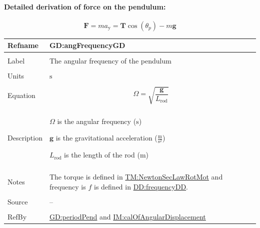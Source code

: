 \documentclass[12pt]{article}
\begin{document}
\paragraph{Detailed derivation of force on the pendulum:}
\label{GD:vForceOnPendulumDeriv}
\begin{displaymath}
\symbf{F}=m {a_{\text{y}}}=\symbf{T} \cos\left({θ_{p}}\right)-m \symbf{g}
\end{displaymath}
\vspace{\baselineskip}
\noindent
\begin{minipage}{\textwidth}
\begin{tabular}{>{\raggedright}p{}>{\raggedright\arraybackslash}p{}}
\toprule \textbf{Refname} & \textbf{GD:angFrequencyGD}
\label{GD:angFrequencyGD}
\\ \midrule \\
Label & The angular frequency of the pendulum
        
\\ \midrule \\
Units & ${\text{s}}$
        
\\ \midrule \\
Equation & \begin{displaymath}
           Ω=\sqrt{\frac{\symbf{g}}{{L_{\text{rod}}}}}
           \end{displaymath}
\\ \midrule \\
Description & \begin{symbDescription}
              \item{$Ω$ is the angular frequency (${\text{s}}$)}
              \item{$\symbf{g}$ is the gravitational acceleration ($\frac{\text{m}}{\text{s}^{2}}$)}
              \item{${L_{\text{rod}}}$ is the length of the rod (${\text{m}}$)}
              \end{symbDescription}
\\ \midrule \\
Notes & The torque is defined in \hyperref[TM:NewtonSecLawRotMot]{TM:NewtonSecLawRotMot} and frequency is $f$ is defined in \hyperref[DD:frequencyDD]{DD:frequencyDD}.
        
\\ \midrule \\
Source & --
         
\\ \midrule \\
RefBy & \hyperref[GD:periodPend]{GD:periodPend} and \hyperref[IM:calOfAngularDisplacement]{IM:calOfAngularDisplacement}
        
\\ \bottomrule
\end{tabular}
\end{minipage}
\end{document}
